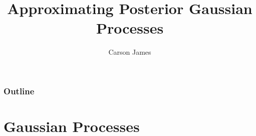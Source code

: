 \documentclass[notheorems]{beamer}
\title{Approximating Posterior Gaussian Processes}
\author{Carson James}
\theoremstyle{definition}
\begin{document}
\frame{\titlepage}

\begin{frame}
\frametitle{Outline}
\tableofcontents
	
\end{frame}

%	

\section{Gaussian Processes}
\end{document}
